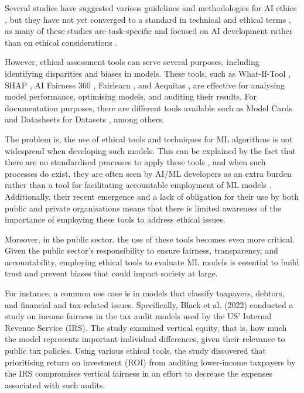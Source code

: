 \documentclass[fleqn,10pt]{wlscirep}
\begin{document}
Several studies have suggested various guidelines and methodologies for AI ethics \cite{Floridi2018,baron2019interpretable,Boddington_2017,Mittelstadt_2019,10.1145/3442188.3445919},  but they have not yet converged to a standard in technical and ethical terms \cite{Hagendorff2020,fjeld2020principled,Jobin2019,zeng2018linking},  as many of these studies are task-specific and focused on AI development rather than on ethical considerations \cite{Ayling2022,Morley2020}.

However, ethical assessment tools can serve several purposes, including identifying disparities and biases in models. These tools, such as What-If-Tool \cite{wexler_2018}, SHAP \cite{NIPS2017_7062}, AI Fairness 360 \cite{aif360-oct-2018}, Fairlearn \cite{weerts2023fairlearn}, and Aequitas \cite{DBLP:journals/corr/abs-1811-05577}, are effective for analysing model performance, optimising models, and auditing their results. For documentation purposes, there are different tools available such as Model Cards \cite{DBLP:journals/corr/abs-1810-03993} and Datasheets for Datasets \cite{DBLP:journals/corr/abs-1803-09010}, among others. 

The problem is, the use of ethical tools and techniques for ML algorithms is not widespread when developing such models. This can be explained by the fact that there are no standardised processes to apply these tools \cite{agarwal2022sevenlayermodelstandardisingai}, and when such processes do exist, they are often seen by AI/ML developers as an extra burden rather than a tool for facilitating accountable employment of ML models \cite{https://doi.org/10.48550/arxiv.2206.02923,ijcai2023p735}. Additionally, their recent emergence and a lack of obligation for their use by both public and private organisations means that there is limited awareness of the importance of employing these tools to address ethical issues.

Moreover, in the public sector, the use of these tools becomes even more critical. Given the public sector’s responsibility to ensure fairness, transparency, and accountability, employing ethical tools to evaluate ML models is essential to build trust and prevent biases that could impact society at large.

For instance, a common use case is in models that classify taxpayers, debtors, and financial and tax-related issues. Specifically, Black et al. (2022) \cite{10.1145/3531146.3533204} conducted a study on income fairness in the tax audit models used by the US' Internal Revenue Service (IRS). The study examined vertical equity, that is, how much the model represents important individual differences, given their relevance to public tax policies. Using various ethical tools, the study discovered that prioritising return on investment (ROI) from auditing lower-income taxpayers by the IRS compromises vertical fairness in an effort to decrease the expenses associated with such audits.
\end{document}
